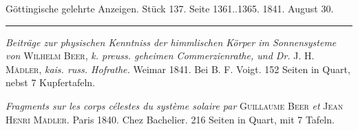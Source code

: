 \par\bigskip
\hypertarget{native-657-lower}{}
\begin{center}\small Göttingische gelehrte Anzeigen. Stück 137. Seite 1361..1365. 1841. August 30.\\[3pt]\rule{.72\linewidth}{.3pt}\end{center}

\emph{Beiträge zur physischen Kenntniss der himmlischen Körper im Sonnensysteme von} \textsc{Wilhelm Beer}, \emph{k. preuss. geheimen Commerzienrathe, und Dr.} J. H. \textsc{Mädler}, \emph{kais. russ. Hofrathe.} Weimar 1841. Bei B. F. Voigt. 152 Seiten in Quart, nebst 7 Kupfertafeln.

\emph{Fragments sur les corps célestes du système solaire par} \textsc{Guillaume Beer} \emph{et} \textsc{Jean Henri Mädler.} Paris 1840. Chez Bachelier. 216 Seiten in Quart, mit 7 Tafeln.

